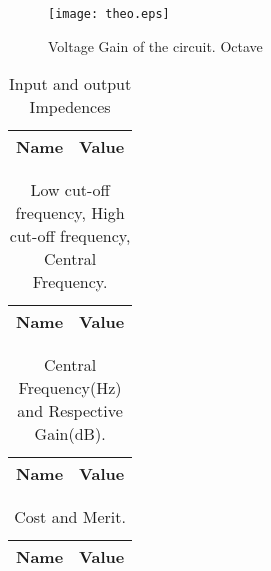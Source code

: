 \begin{figure}[h] \centering
\texttt{[image: theo.eps]}
\caption{Voltage Gain of the circuit. Octave}
\label{sh}
\end{figure}




\begin{table}[ht]
  \centering
  \begin{tabular}{|l|r|}
    \hline    
    {\bf Name} & {\bf Value} \\ \hline
    
  \end{tabular}
  \caption{Input and output Impedences}
  \label{tab:2}
\end{table}



\begin{table}[ht]
  \centering
  \begin{tabular}{|l|r|}
    \hline    
    {\bf Name} & {\bf Value} \\ \hline
    
  \end{tabular}
  \caption{Low cut-off frequency, High cut-off frequency, Central Frequency.}
\end{table}



\begin{table}[ht]
  \centering
  \begin{tabular}{|l|r|}
    \hline    
    {\bf Name} & {\bf Value} \\ \hline
    
  \end{tabular}
  \caption{Central Frequency(Hz) and Respective Gain(dB).}
\end{table}


\begin{table}[ht]
  \centering
  \begin{tabular}{|l|r|}
    \hline    
    {\bf Name} & {\bf Value} \\ \hline
    
  \end{tabular}
  \caption{Cost and Merit.}
\end{table}











